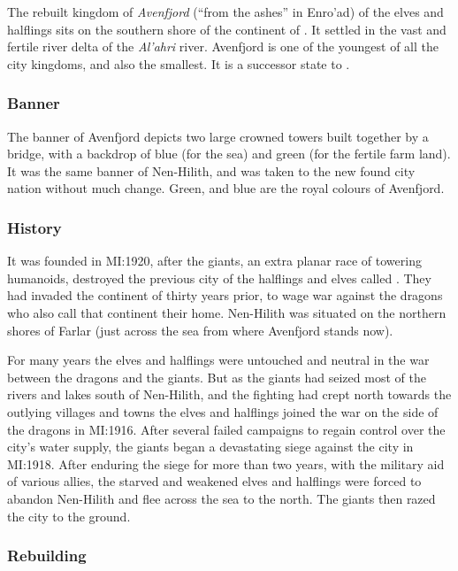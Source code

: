 The rebuilt kingdom of \emph{Avenfjord} (``from the ashes'' in Enro'ad) of the
elves and halflings sits on the southern shore of the continent of
. It settled in the vast and fertile river delta of the
\emph{Al'ahri} river. Avenfjord is one of the youngest of all the city
kingdoms, and also the smallest. It is a successor state to
.

\subsubsection{Banner}

The banner of Avenfjord depicts two large crowned towers built together by a
bridge, with a backdrop of blue (for the sea) and green (for the fertile farm
land). It was the same banner of Nen-Hilith, and was taken to the new found
city nation without much change. Green, and blue are the royal colours of
Avenfjord.

\subsubsection{History}

It was founded in MI:1920, after the giants, an extra planar race of towering
humanoids, destroyed the previous city of the halflings and elves called
. They had invaded the continent of
 thirty years prior, to wage war against the dragons who
also call that continent their home. Nen-Hilith was situated on the northern
shores of Farlar (just across the sea from where Avenfjord stands now).

For many years the elves and halflings were untouched and neutral in the war
between the dragons and the giants. But as the giants had seized most of the
rivers and lakes south of Nen-Hilith, and the fighting had crept north towards
the outlying villages and towns the elves and halflings joined the war on the
side of the dragons in MI:1916. After several failed campaigns to regain
control over the city's water supply, the giants began a devastating siege
against the city in MI:1918. After enduring the siege for more than two years,
with the military aid of various allies, the starved and weakened elves and
halflings were forced to abandon Nen-Hilith and flee across the sea to the
north. The giants then razed the city to the ground.

\subsubsection{Rebuilding}

